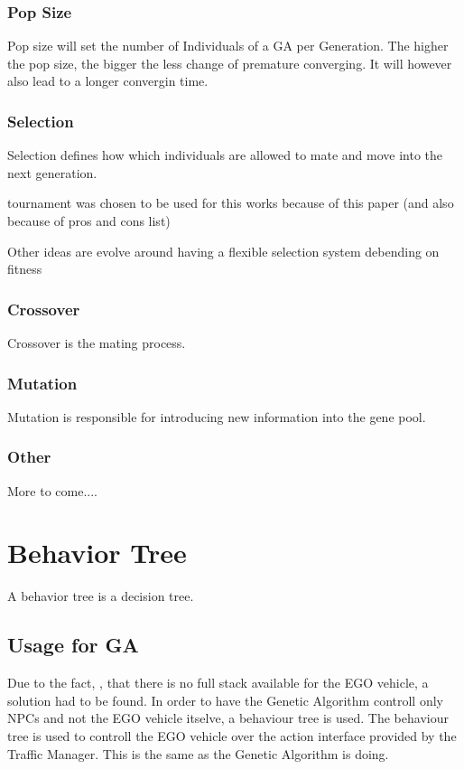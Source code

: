 \subsubsection{Pop Size}
Pop size will set the number of Individuals of a GA per Generation. The higher the pop size, the bigger the less change of premature converging. 
It will however also lead to a longer convergin time.

\subsubsection{Selection}
Selection defines how which individuals are allowed to mate and move into the next generation.

tournament was chosen to be used for this works because of this paper (and also because of pros and cons list)

Other ideas are evolve around having a flexible selection system debending on fitness 

\subsubsection{Crossover}
Crossover is the mating process.


\subsubsection{Mutation}
Mutation is responsible for introducing new information into the gene pool.


\subsubsection{Other}
More to come....

\section{Behavior Tree}
A behavior tree is a decision tree. 

\subsection{Usage for GA}
Due to the fact, , that there is no full stack available for the EGO vehicle, a solution had to be found.
In order to have the Genetic Algorithm controll only NPCs and not the EGO vehicle itselve, a behaviour tree is used.
The behaviour tree is used to controll the EGO vehicle over the action interface provided by the Traffic Manager. This is the same as the Genetic Algorithm is doing.

